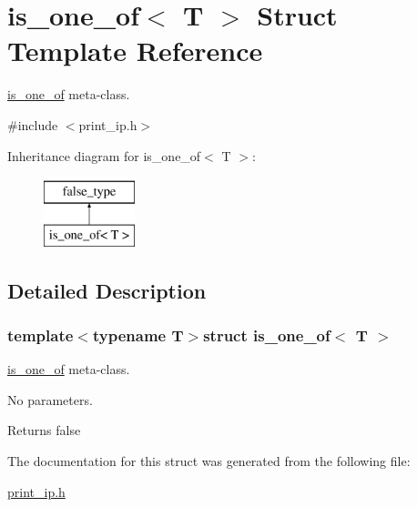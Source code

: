 \hypertarget{structis__one__of_3_01T_01_4}{\section{is\-\_\-one\-\_\-of$<$ T $>$ Struct Template Reference}
\label{structis__one__of_3_01T_01_4}
}


\hyperlink{structis__one__of}{is\-\_\-one\-\_\-of} meta-\/class.  




{\ttfamily \#include $<$print\-\_\-ip.\-h$>$}

Inheritance diagram for is\-\_\-one\-\_\-of$<$ T $>$\-:\begin{figure}[H]
\begin{center}
\leavevmode
\includegraphics[height=2.000000cm]{structis__one__of_3_01T_01_4}
\end{center}
\end{figure}


\subsection{Detailed Description}
\subsubsection*{template$<$typename T$>$struct is\-\_\-one\-\_\-of$<$ T $>$}

\hyperlink{structis__one__of}{is\-\_\-one\-\_\-of} meta-\/class. 

No parameters. \begin{DoxyReturn}{Returns}
false 
\end{DoxyReturn}


The documentation for this struct was generated from the following file\-:\begin{DoxyCompactItemize}
\item 
\hyperlink{print__ip_8h}{print\-\_\-ip.\-h}\end{DoxyCompactItemize}
